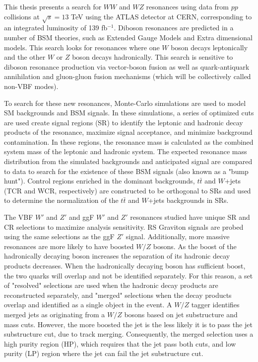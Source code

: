 This thesis presents a search for $WW$ and $WZ$ resonances using data from $pp$ collisions at $\sqrt{s}=13$ TeV using the ATLAS detector at CERN, corresponding to an integrated luminosity of 139 fb$^{-1}$. Diboson resonances are predicted in a number of BSM theories, such as Extended Gauge Models and Extra dimensional models. This search looks for resonances where one $W$ boson decays leptonically and the other $W$ or $Z$ boson decays hadronically. This search is sensitive to diboson resonance production via vector-boson fusion as well as quark-antiquark annihilation and gluon-gluon fusion mechanisms (which will be collectively called non-VBF modes).

To search for these new resonances, Monte-Carlo simulations are used to model SM backgrounds and BSM signals. In these simulations, a series of optimized cuts are used create signal regions (SR) to identify the leptonic and hadronic decay products of the resonance, maximize signal acceptance, and minimize background contamination. In these regions, the resonance mass is calculated as the combined system mass of the leptonic and hadronic system. The expected resonance mass distribution from the simulated backgrounds and anticipated signal are compared to data to search for the existence of these BSM signals (also known as a "bump hunt"). Control regions enriched in the dominant backgrounds, $t\bar{t}$ and $W$+jets (TCR and WCR, respectively) are constructed to be orthogonal to SRs and used to determine the normalization of the $t\bar{t}$ and $W$+jets backgrounds in SRs.

The VBF $W'$ and $Z'$ and ggF $W'$ and $Z'$ resonances studied have unique SR and CR selections to maximize analysis sensitivity. RS Graviton signals are probed using the same selections as the ggF $Z'$ signal. Additionally, more massive resonances are more likely to have boosted $W/Z$ bosons. As the boost of the hadronically decaying boson increases the separation of its hadronic decay products decreases. When the hadronically decaying boson has sufficient boost, the two quarks will overlap and not be identified separately. For this reason, a set of "resolved" selections are used when the hadronic decay products are reconstructed separately, and "merged" selections when the decay products overlap and identified as a single object in the event. A $W/Z$ tagger identifies merged jets as originating from a $W/Z$ bosons based on jet substructure and mass cuts. However, the more boosted the jet is the less likely it is to pass the jet substructure cut, due to track merging. Consequently, the merged selection uses a high purity region (HP), which requires that the jet pass both cuts, and low purity (LP) region where the jet can fail the jet substructure cut. 

